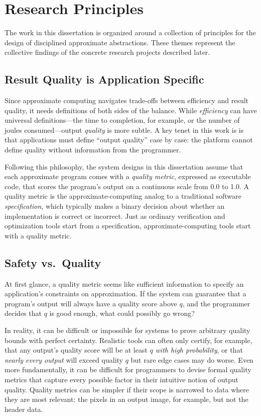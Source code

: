 \section{Research Principles}

The work in this dissertation is organized around a collection of principles
for the design of disciplined approximate abstractions.
These themes represent the collective findings of the concrete research
projects described later.

\subsection{Result Quality is Application Specific}

Since approximate computing navigates trade-offs between efficiency and result
quality, it needs definitions of both sides of the balance.
While \emph{efficiency} can have universal definitions---the time to
completion, for example, or the number of joules consumed---output
\emph{quality} is more subtle.
A key tenet in this work is is that applications must define ``output
quality'' case by case:
the platform cannot define quality without information from the programmer.

Following this philosophy, the system designs in this dissertation assume that
each approximate program comes with a \emph{quality metric}, expressed as
executable code, that scores the program's output on a continuous scale from
0.0 to 1.0.
A quality metric is the approximate-computing analog to a traditional software
\emph{specification}, which typically makes a binary decision about whether an
implementation is correct or incorrect.
Just as ordinary verification and optimization tools start from a
specification, approximate-computing tools start with a quality metric.

\subsection{Safety vs.~Quality}
\label{sec:princ:safety}

At first glance, a quality metric seems like sufficient information to specify
an application's constraints on approximation.
If the system can guarantee that a program's output will always have a quality
score above $q$, and the programmer decides that $q$ is good enough, what
could possibly go wrong?

In reality, it can be difficult or impossible for systems to prove arbitrary
quality bounds with perfect certainty.
Realistic tools can often only certify, for example, that any output's quality
score will be at least $q$ \emph{with high probability},
or that \emph{nearly every output} will exceed quality $q$ but rare edge cases
may do worse.
Even more fundamentally, it can be difficult for programmers to devise formal
quality metrics that capture every possible factor in their intuitive notion
of output quality.
Quality metrics can be simpler if their scope is narrowed to data where they
are most relevant: the pixels in an output image, for example, but not the
header data.

